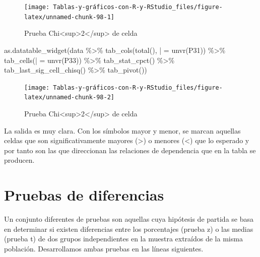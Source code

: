 \documentclass[
]{book}
\newenvironment{Shaded}{\begin{snugshade}}{\end{snugshade}}
\newcommand{\AttributeTok}[1]{\textcolor[rgb]{0.77,0.63,0.00}{#1}}
\newcommand{\FunctionTok}[1]{\textcolor[rgb]{0.00,0.00,0.00}{#1}}
\newcommand{\NormalTok}[1]{#1}
\newcommand{\OtherTok}[1]{\textcolor[rgb]{0.56,0.35,0.01}{#1}}
\newcommand{\SpecialCharTok}[1]{\textcolor[rgb]{0.00,0.00,0.00}{#1}}
\newcommand{\StringTok}[1]{\textcolor[rgb]{0.31,0.60,0.02}{#1}}
\begin{document}
\begin{figure}[H]

{\centering \texttt{[image: Tablas-y-gráficos-con-R-y-RStudio\_files/figure-latex/unnamed-chunk-98-1]} 

}

\caption{Prueba Chi<sup>2</sup> de celda}\label{fig:unnamed-chunk-98}
\end{figure}

\begin{Shaded}
\begin{Highlighting}[]
\FunctionTok{as.datatable\_widget}\NormalTok{(data }\SpecialCharTok{\%\textgreater{}\%} \FunctionTok{tab\_cols}\NormalTok{(}\FunctionTok{total}\NormalTok{(), }\StringTok{\textasciigrave{}}\AttributeTok{|}\StringTok{\textasciigrave{}} \OtherTok{=} \FunctionTok{unvr}\NormalTok{(P31)) }\SpecialCharTok{\%\textgreater{}\%} 
  \FunctionTok{tab\_cells}\NormalTok{(}\StringTok{\textasciigrave{}}\AttributeTok{|}\StringTok{\textasciigrave{}} \OtherTok{=} \FunctionTok{unvr}\NormalTok{(P33)) }\SpecialCharTok{\%\textgreater{}\%} \FunctionTok{tab\_stat\_cpct}\NormalTok{() }\SpecialCharTok{\%\textgreater{}\%} \FunctionTok{tab\_last\_sig\_cell\_chisq}\NormalTok{() }\SpecialCharTok{\%\textgreater{}\%} 
  \FunctionTok{tab\_pivot}\NormalTok{())}
\end{Highlighting}
\end{Shaded}

\begin{figure}[H]

{\centering \texttt{[image: Tablas-y-gráficos-con-R-y-RStudio\_files/figure-latex/unnamed-chunk-98-2]} 

}

\caption{Prueba Chi<sup>2</sup> de celda}\label{fig:unnamed-chunk-98}
\end{figure}

La salida es muy clara. Con los símbolos mayor y menor, se marcan aquellas celdas que son significativamente mayores (\textgreater) o menores (\textless) que lo esperado y por tanto son las que direccionan las relaciones de dependencia que en la tabla se producen.

\hypertarget{pruebas-de-diferencias}{%
\section{Pruebas de diferencias}\label{pruebas-de-diferencias}}

Un conjunto diferentes de pruebas son aquellas cuya hipótesis de partida se basa en determinar si existen diferencias entre los porcentajes (prueba z) o las medias (prueba t) de dos grupos independientes en la muestra extraídos de la misma población. Desarrollamos ambas pruebas en las líneas siguientes.
\end{document}
